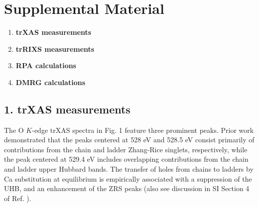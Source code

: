 \documentclass[aps, prl, preprint, superscriptaddress]{revtex4-2}
\begin{document}
\author{Yao Wang}

\author{Matteo Mitrano}


\maketitle
\vspace{-10mm}
\section*{Supplemental Material}












\begin{enumerate}
\item \textbf{trXAS measurements}
\item \textbf{trRIXS measurements}
\item \textbf{RPA calculations}
\item \textbf{DMRG calculations}
\end{enumerate}

\clearpage

\noindent
\subsection{1. trXAS measurements}





The O $K$-edge trXAS spectra in Fig. 1 feature three prominent peaks. Prior work \cite{nucker2000hole} demonstrated that the peaks centered at 528 eV and 528.5 eV consist primarily of contributions from the chain and ladder Zhang-Rice singlets, respectively, while the peak centered at 529.4 eV includes overlapping contributions from the chain and ladder upper Hubbard bands. The transfer of holes from chains to ladders by Ca substitution at equilibrium is empirically associated with a suppression of the UHB, and an enhancement of the ZRS peaks \cite{nucker2000hole} (also see discussion in SI Section 4 of Ref. \cite{padma2025symmetry}).
\end{document}
